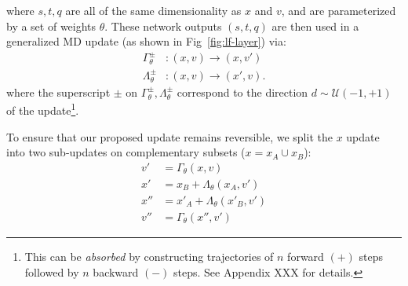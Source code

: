 \documentclass[a4paper,11pt]{article}
\begin{document}
%
where $s, t, q$ are all of the same dimensionality as $x$ and $v$, and are parameterized by a set of weights $\theta$.
%
These network outputs $(s, t, q)$ are then used in a generalized MD update (as shown in Fig~\ref{fig:lf-layer}) via:
%
\begin{align}
\Gamma^{\pm}_{\theta}&: (x, v) \rightarrow (x, v') \\
\Lambda^{\pm}_{\theta}&: (x, v) \rightarrow (x', v).
\end{align}
%
where the superscript $\pm$ on $\Gamma^{\pm}_{\theta}, \Lambda^{\pm}_{\theta}$ correspond to the direction $d \sim \mathcal{U}(-1, +1)$ of the update\footnote{This can be \textit{absorbed} by constructing trajectories of $n$ forward $(+)$ steps followed by $n$ backward $(-)$ steps. See Appendix XXX for details.}.
%

To ensure that our proposed update remains reversible, we split the $x$ update into two sub-updates on complementary subsets ($x = x_{A} \cup x_{B}$):
%
\begin{align}
v' &= \Gamma_{\theta}(x, v) \\
x' &= x_{B} + \Lambda_{\theta}(x_{A}, v') \\
x'' &= x'_{A} + \Lambda_{\theta}(x'_{B}, v') \\
v'' &= \Gamma_{\theta}(x'', v')
\end{align}
%
%
\end{document}
